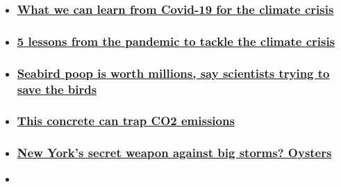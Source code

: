 \begin{itemize}
\item
  \hypertarget{what-we-can-learn-from-covid-19-for-the-climate-crisis}{%
  \subsubsection{\texorpdfstring{\href{/videos/weather/2020/08/07/bill-weir-climate-covid-19-project-planet-orig.cnn}{What
  we can learn from Covid-19 for the climate
  crisis}}{What we can learn from Covid-19 for the climate crisis}}\label{what-we-can-learn-from-covid-19-for-the-climate-crisis}}
\item
  \hypertarget{5-lessons-from-the-pandemic-to-tackle-the-climate-crisis-}{%
  \subsubsection{\texorpdfstring{\href{/2020/08/07/weather/5-lessons-coronavirus-climate-crisis-weir-wxc/index.html}{5
  lessons from the pandemic to tackle the climate crisis
  }}{5 lessons from the pandemic to tackle the climate crisis }}\label{5-lessons-from-the-pandemic-to-tackle-the-climate-crisis-}}
\item
  \hypertarget{seabird-poop-is-worth-millions-say-scientists-trying-to-save-the-birds}{%
  \subsubsection{\texorpdfstring{\href{/2020/08/06/world/sea-bird-conservation-value-of-poop-scn-trnd/index.html}{Seabird
  poop is worth millions, say scientists trying to save the
  birds}}{Seabird poop is worth millions, say scientists trying to save the birds}}\label{seabird-poop-is-worth-millions-say-scientists-trying-to-save-the-birds}}
\item
  \hypertarget{this-concrete-can-trap-co2-emissions}{%
  \subsubsection{\texorpdfstring{\href{/videos/business/2019/12/02/concrete-carbon-cure-co2-linkedin-update-orig.cnn}{This
  concrete can trap CO2
  emissions}}{This concrete can trap CO2 emissions}}\label{this-concrete-can-trap-co2-emissions}}
\item
  \hypertarget{new-yorks-secret-weapon-against-big-storms-oysters}{%
  \subsubsection{\texorpdfstring{\href{/videos/business/2019/01/16/oysters-breakwaters-new-york-mission-ahead.cnn-business}{New
  York's secret weapon against big storms?
  Oysters}}{New York's secret weapon against big storms? Oysters}}\label{new-yorks-secret-weapon-against-big-storms-oysters}}
\item
  \hypertarget{two-canadian-arctic-ice-caps-have-completely-disappeared-satellite-imagery-shows}{%
}
\end{itemize}
